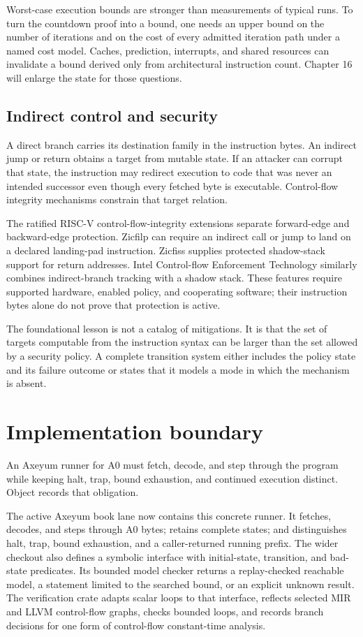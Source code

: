Worst-case execution bounds are stronger than measurements of typical runs.
To turn the countdown proof into a bound, one needs an upper bound on the
number of iterations and on the cost of every admitted iteration path under a
named cost model. Caches, prediction, interrupts, and shared resources can
invalidate a bound derived only from architectural instruction count. Chapter
16 will enlarge the state for those questions.

\subsection{Indirect control and security}

A direct branch carries its destination family in the instruction bytes. An
indirect jump or return obtains a target from mutable state. If an attacker can
corrupt that state, the instruction may redirect execution to code that was
never an intended successor even though every fetched byte is executable.
Control-flow integrity mechanisms constrain that target relation.

The ratified RISC-V control-flow-integrity extensions separate forward-edge
and backward-edge protection. Zicfilp can require an indirect call or jump to
land on a declared landing-pad instruction. Zicfiss supplies protected
shadow-stack support for return addresses. Intel Control-flow Enforcement
Technology similarly combines indirect-branch tracking with a shadow stack.
These features require supported hardware, enabled policy, and cooperating
software; their instruction bytes alone do not prove that protection is
active.\autocite{riscv2026cfi,intel2020cet}

The foundational lesson is not a catalog of mitigations. It is that the set of
targets computable from the instruction syntax can be larger than the set allowed by a
security policy. A complete transition system either includes the policy state
and its failure outcome or states that it models a mode in which the mechanism
is absent.

\section{Implementation boundary}

An Axeyum runner for A0 must fetch, decode, and step through the program while
keeping halt, trap, bound exhaustion, and continued execution distinct.
Object  records that obligation.

The active Axeyum book lane now contains this concrete runner. It fetches,
decodes, and steps through A0 bytes; retains complete states; and distinguishes
halt, trap, bound exhaustion, and a caller-returned running prefix. The wider
checkout also defines a symbolic  interface with
initial-state, transition, and bad-state predicates. Its bounded model checker
returns a replay-checked reachable model, a statement limited to the searched
bound, or an explicit unknown result. The verification crate adapts scalar
loops to that interface, reflects selected MIR and LLVM control-flow graphs,
checks bounded loops, and records branch decisions for one form of
control-flow constant-time analysis.

